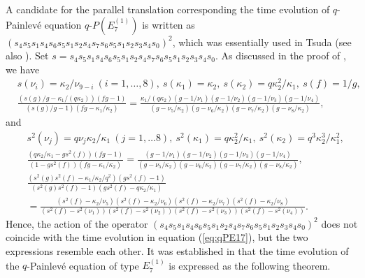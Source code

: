 \documentclass[12pt]{amsart}
\numberwithin{equation}{section}
\theoremstyle{definition}
\begin{document}
A candidate for the parallel translation corresponding the time evolution of $q$-Painlev\'e equation $q$-$P(E^{(1)}_7)$ is written as $ ( s_4 s_5 s_1 s_4 s_6 s_5 s_1 s_2 s_4 s_7 s_6 s_5 s_1 s_2 s_3 s_4 s_0  )^2 $, which was essentially used in Tsuda \cite{Td} (see also \cite{TsqP}).
Set $s= s_4 s_5 s_1 s_4 s_6 s_5 s_1 s_2 s_4 s_7 s_6 s_5 s_1 s_2 s_3 s_4 s_0 $.
As discussed in the proof of \cite[Theorem 4.1]{TsqP}, we have
\begin{align}
& s(\nu_i) = \kappa_2 /\nu_{9-i} \:  (i=1,\dots ,8), \: s (\kappa _1 ) = \kappa_2 , \: s (\kappa _2 ) = q  \kappa_2^2 / \kappa_1 , \: s (f) = 1/g , \label{eq:E7sg} \\
& \frac{( s(g)/g -\kappa_1/(q \kappa_2))(fg -1)}{(s(g)/g -1)(f g -\kappa_1 /\kappa_2 )} = \frac{ \kappa_1/(q \kappa_2 ) (g -1/\nu_1)(g -1/\nu_2)(g -1/\nu_3)( g -1/\nu_4 )}{ (g - \nu_5 /\kappa_2)(g - \nu_6 /\kappa_2)(g - \nu_7 /\kappa_2 )(g - \nu_8 /\kappa_2 )} , \nonumber
\end{align}
and 
\begin{align}
& s^2(\nu _j) = q \nu _j \kappa_2 /\kappa_1 \: (j=1,\dots 8), \: s^2 (\kappa_1) = q \kappa_2^2 /\kappa_1, \: s^2 (\kappa_2 ) = q^3 \kappa_2^3 /\kappa_1^2, \\
& \frac{(  q \kappa_2/\kappa_1  - g s^2(f) )(fg -1)}{(1-g s^2 (f))(f g -\kappa_1 /\kappa_2 )} = \frac{ (g -1/\nu_1)(g -1/\nu_2)(g -1/\nu_3)( g -1/\nu_4 )}{ (g - \nu_5 /\kappa_2)(g - \nu_6 /\kappa_2)(g - \nu_7 /\kappa_2 )(g - \nu_8 /\kappa_2 )} , \nonumber \\
& \frac{( s^2(g)s^2 (f) -\kappa_1/\kappa_2/q^2 )( g s^2 (f) -1)}{(s^2(g)s^2 (f) -1)(g s^2 (f) -q \kappa_2/\kappa_1 )} \nonumber \\
& = \frac{ (s^2 (f) - \kappa_2 /\nu_5 ) (s^2 (f) - \kappa_2 /\nu_6 ) (s^2 (f) - \kappa_2 /\nu_7 ) (s^2 (f) - \kappa_2 /\nu_8 )  }{ ( s^2 (f) -s^2 ( \nu_1 )) ( s^2 (f) -s^2 ( \nu_2 )) ( s^2 (f) -s^2 ( \nu_3 )) ( s^2 (f) -s^2 ( \nu_4 )) } . \nonumber 
\end{align}
Hence, the action of the operator $( s_4 s_5 s_1 s_4 s_6 s_5 s_1 s_2 s_4 s_7 s_6 s_5 s_1 s_2 s_3 s_4 s_0 )^2 $ does not coincide with the time evolution in equation (\ref{eq:qPE17}), but the two expressions resemble each other.
It was established in \cite{TsqP} that the time evolution of the $q$-Painlev\'e equation of type $E^{(1)}_7 $ is expressed as the following theorem.
\end{document}
